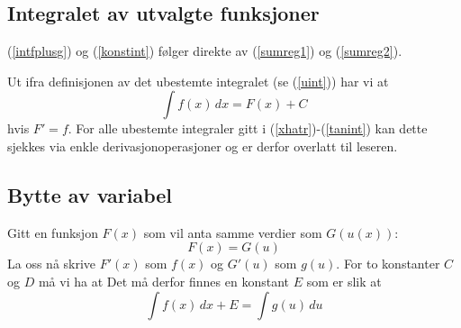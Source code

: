 \begin{comment}
	Sammenhengen vi akkurat har studert for integral og areal er sentral når vi nå skal gå over til å forstå konseptet bak \textit{Analysens fundamentalteorem}, som har enorm betydning for integralregning.
	
	Tenk nå at vi har en funksjon $ A(x)=\int\limits_{a}^x f(t)\,dt $ hvor $ f(t)\geq 0$. $ A $ gir oss da arealet avgrenset av horisontalaksen, grafen $ f $ og linjene $ t=a $ og $ t=x $. Tenk så at vi flytter oss en liten avstand $ \Delta x $ fra $ x $, det avgrensede arealet blir da $ A(x+\Delta x) $. Forskjellen $ \Delta A $ mellom $ A(x) $ og $ A(x+\Delta x) $ blir:
	\[ \Delta A = A(x+\Delta x)-A(x) \]
	{int4}
	Fra \fref{fund} kan vi nå skrive:
	\[ \Delta A = f(x)\Delta x + c	 \]
	hvor $0\leq c\leq |(f(x+\Delta x)-f(x))\Delta x|$.
	
	Dersom vi nå flytter over $ c $, deler på begge sider med $ \Delta x$ og finner grensen når $ \Delta x \to 0$, får vi:
	\alg{
	\lim\limits_{\Delta x\to 0}\left[\frac{\Delta A}{\Delta x} - \frac{g(x)}{\Delta x}\right] &= f(x)
	}
	Det kan vises (prøv gjerne selv) at $ \lim\limits_{\Delta x\to 0}\frac{c}{\Delta x} =0$, og vi har da at:
	\alg{\lim\limits_{\Delta x\to 0} \frac{\Delta A}{\Delta x} &= f(x) \\[5 pt]
	A'(x)&=f(x) 	
	}
\end{comment}
\newpage
\subsection*{Integralet av utvalgte funksjoner}
(\ref{intfplusg}) og (\ref{konstint}) følger direkte av (\ref{sumreg1}) og (\ref{sumreg2}).\vsk

Ut ifra definisjonen av det ubestemte integralet (se (\ref{uint})) har vi at
\[ \int f(x)\,dx = F(x)+C \]
hvis $ {F'=f}  $. For alle ubestemte integraler gitt i (\ref{xhatr})-(\ref{tanint}) kan dette sjekkes via enkle derivasjonoperasjoner og er derfor overlatt til leseren.


\subsection*{Bytte av variabel}
Gitt en funksjon $ F(x) $ som vil anta samme verdier som $ G(u(x)) $:
\begin{equation}
 F(x)=G(u)  
\end{equation}
La oss nå skrive $ F'(x) $ som $ f(x) $ og $ G'(u) $ som $ g(u) $. For to konstanter $ C $ og $ D $ må vi ha at
 Det må derfor finnes en konstant $ E $ som er slik at
\[ \int f(x)\, dx+E=\int g(u)\, du\]

